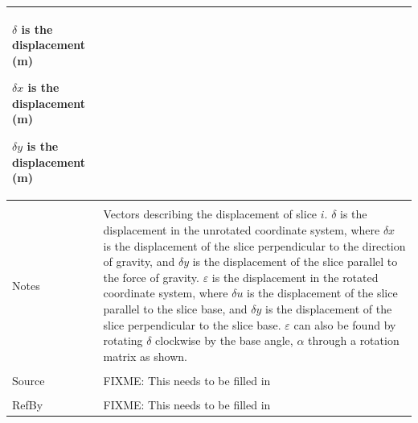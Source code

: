 \documentclass[12pt]{article}
\begin{document}
\begin{minipage}{\textwidth}
\begin{tabular}{p{} p{}}
\begin{symbDescription}
              \item{$δ$ is the displacement (m)}
              \item{$δx$ is the displacement (m)}
              \item{$δy$ is the displacement (m)}
              \end{symbDescription}
\\ \midrule \\
Notes & Vectors describing the displacement of slice $i$. $δ$ is the displacement in the unrotated coordinate system, where $δx$ is the displacement of the slice perpendicular to the direction of gravity, and $δy$ is the displacement of the slice parallel to the force of gravity. $ε$ is the displacement in the rotated coordinate system, where $δu$ is the displacement of the slice parallel to the slice base, and $δy$ is the displacement of the slice perpendicular to the slice base. $ε$ can also be found by rotating $δ$ clockwise by the base angle, $α$ through a rotation matrix as shown.
\\ \midrule \\
Source & FIXME: This needs to be filled in
\\ \midrule \\
RefBy & FIXME: This needs to be filled in
\\ \bottomrule \end{tabular}
\end{minipage}\\
\end{document}
